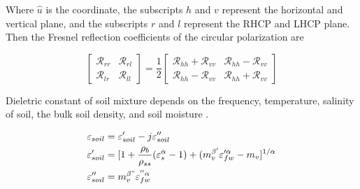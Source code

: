 \documentclass[draftcls,onecolumn]{IEEEtran}  %
\begin{document}
Where $\hat{u}$ is the coordinate, the subscripts $h$ and $v$ represent the horizontal and vertical plane, and the subscripts $r$ and $l$ represent the RHCP and LHCP plane. Then the Fresnel reflection coefficients of the circular polarization are

\begin{equation}
	\begin{bmatrix}
	\mathcal{R}_{rr} & \mathcal{R}_{rl} \\
	\mathcal{R}_{lr} & \mathcal{R}_{ll}
	\end{bmatrix} = 
	\frac{1}{2}
	\begin{bmatrix}
	\mathcal{R}_{hh} + \mathcal{R}_{vv} & \mathcal{R}_{hh} - \mathcal{R}_{vv} \\
	\mathcal{R}_{hh} - \mathcal{R}_{vv} & \mathcal{R}_{hh} + \mathcal{R}_{vv}		\end{bmatrix}
\end{equation}





Dieletric constant of soil mixture depends on the frequency, temperature, salinity of soil, the bulk soil density, and soil moisture \cite{Peplinski:1995,Peplinski_correct:1995}.

\begin{equation} \label{eq: soil_dielectric_main}
\begin{split}
		 { \varepsilon_{soil} } &=  { \varepsilon'_{soil} } -j { \varepsilon''_{soil} } \\
    	 { \varepsilon'_{soil} } &= [1 + \frac{\rho_b}{\rho_{ss}} ( {\varepsilon_{s}^{\alpha}}-1) + (m_v^{\beta'}\varepsilon_{fw}^{\prime\alpha}-m_v]^{1/\alpha} \\
         { \varepsilon''_{soil} } &=m_v^{\beta"}\varepsilon_{fw}^{''\alpha}
\end{split}
\end{equation}
\end{document}
